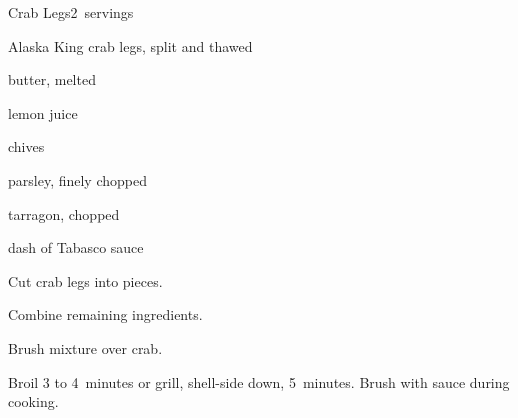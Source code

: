 \begin{recipe}{Crab Legs}{}{2~servings}

\begin{ingredients}
\item {} Alaska King crab legs, split and thawed
\item \C{\quarter} butter, melted
\item {} lemon juice
\item {} chives
\item {} parsley, finely chopped
\item \tp{\quarter} tarragon, chopped
\item dash of Tabasco sauce
\end{ingredients}

\begin{directions}
\item Cut crab legs into  pieces.
\item Combine remaining ingredients.
\item Brush mixture over crab.
\item Broil 3 to 4~minutes or grill, shell-side down, 5~minutes. Brush with sauce during cooking.
\end{directions}

\end{recipe}
